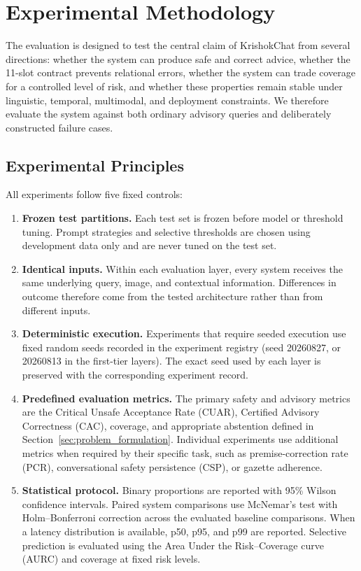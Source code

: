 \documentclass[a4paper,fleqn]{cas-dc}
\begin{document}
\section{Experimental Methodology}
\label{sec:experimental_methodology}

The evaluation is designed to test the central claim of KrishokChat from several directions: whether the system can produce safe and correct advice, whether the 11-slot contract prevents relational errors, whether the system can trade coverage for a controlled level of risk, and whether these properties remain stable under linguistic, temporal, multimodal, and deployment constraints. We therefore evaluate the system against both ordinary advisory queries and deliberately constructed failure cases.

\subsection{Experimental Principles}

All experiments follow five fixed controls:
\begin{enumerate}
    \item[\textbf{C1:}] \textbf{Frozen test partitions.} Each test set is frozen before model or threshold tuning. Prompt strategies and selective thresholds are chosen using development data only and are never tuned on the test set.
    \item[\textbf{C2:}] \textbf{Identical inputs.} Within each evaluation layer, every system receives the same underlying query, image, and contextual information. Differences in outcome therefore come from the tested architecture rather than from different inputs.
    \item[\textbf{C3:}] \textbf{Deterministic execution.} Experiments that require seeded execution use fixed random seeds recorded in the experiment registry (seed 20260827, or 20260813 in the first-tier layers). The exact seed used by each layer is preserved with the corresponding experiment record.
    \item[\textbf{C4:}] \textbf{Predefined evaluation metrics.} The primary safety and advisory metrics are the Critical Unsafe Acceptance Rate (CUAR), Certified Advisory Correctness (CAC), coverage, and appropriate abstention defined in Section~\ref{sec:problem_formulation}. Individual experiments use additional metrics when required by their specific task, such as premise-correction rate (PCR), conversational safety persistence (CSP), or gazette adherence.
    \item[\textbf{C5:}] \textbf{Statistical protocol.} Binary proportions are reported with 95\% Wilson confidence intervals. Paired system comparisons use McNemar's test with Holm--Bonferroni correction across the evaluated baseline comparisons. When a latency distribution is available, p50, p95, and p99 are reported. Selective prediction is evaluated using the Area Under the Risk--Coverage curve (AURC) and coverage at fixed risk levels.
\end{enumerate}
\end{document}

